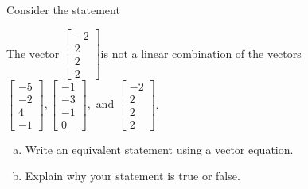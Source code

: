 
\begin{exerciseStatement}


Consider the statement 
\begin{center}\begin{minipage}{0.8\textwidth}
 The vector \( \left[\begin{array}{c}
-2 \\
2 \\
2 \\
2
\end{array}\right] \)is not a linear combination of the vectors \( \left[\begin{array}{c}
-5 \\
-2 \\
4 \\
-1
\end{array}\right] , \left[\begin{array}{c}
-1 \\
-3 \\
-1 \\
0
\end{array}\right] , \text{ and } \left[\begin{array}{c}
-2 \\
2 \\
2 \\
2
\end{array}\right] \). 
\end{minipage}\end{center}
    


\begin{enumerate}[(a)]
\item  Write an equivalent statement using a vector equation.
\item  Explain why your statement is true or false.
\end{enumerate}
    
\end{exerciseStatement}
    
